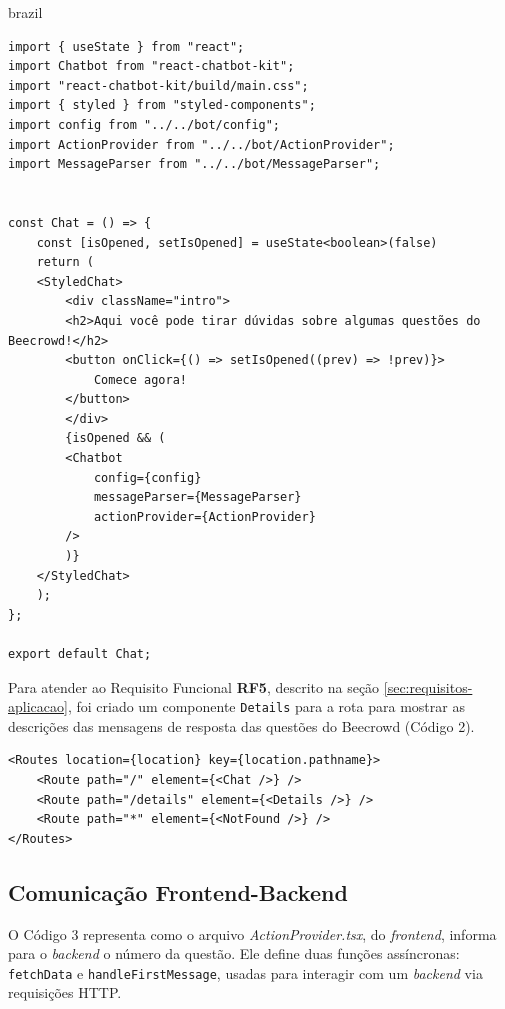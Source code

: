 \begin{otherlanguage*}{brazil}
\begin{lstlisting}[style=ufscthesisx_style, caption={Componente Chat}]
import { useState } from "react";
import Chatbot from "react-chatbot-kit";
import "react-chatbot-kit/build/main.css";
import { styled } from "styled-components";
import config from "../../bot/config";
import ActionProvider from "../../bot/ActionProvider";
import MessageParser from "../../bot/MessageParser";


const Chat = () => {
    const [isOpened, setIsOpened] = useState<boolean>(false)
    return (
    <StyledChat>
        <div className="intro">
        <h2>Aqui você pode tirar dúvidas sobre algumas questões do Beecrowd!</h2>
        <button onClick={() => setIsOpened((prev) => !prev)}>
            Comece agora!
        </button>
        </div>
        {isOpened && (
        <Chatbot
            config={config}
            messageParser={MessageParser}
            actionProvider={ActionProvider}
        />
        )}
    </StyledChat>
    );
};

export default Chat;    
\end{lstlisting}

Para atender ao Requisito Funcional \textbf{RF5}, descrito na seção \ref{sec:requisitos-aplicacao}, foi criado um componente \texttt{Details} para a rota  para mostrar as descrições das mensagens de resposta das questões do Beecrowd (Código 2).

\begin{lstlisting}[style=ufscthesisx_style, caption={Rotas do frontend}]
<Routes location={location} key={location.pathname}>
    <Route path="/" element={<Chat />} />
    <Route path="/details" element={<Details />} />
    <Route path="*" element={<NotFound />} />
</Routes>
\end{lstlisting}

\subsection{Comunicação Frontend-Backend}

O Código 3 representa como o arquivo \textit{ActionProvider.tsx}, do \textit{frontend}, informa para o \textit{backend} o número da questão. Ele define duas funções assíncronas: \texttt{fetchData} e \texttt{handleFirstMessage}, usadas para interagir com um \textit{backend} via requisições HTTP. 


\end{otherlanguage*}
